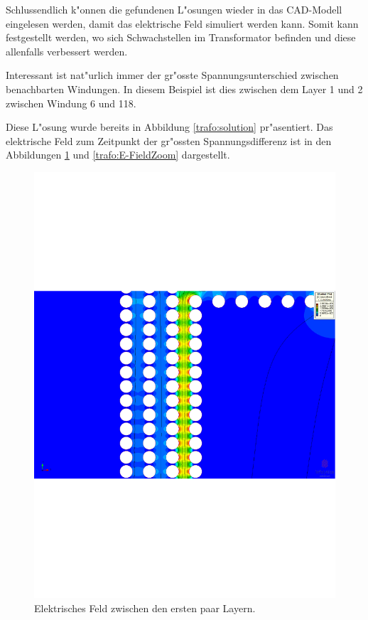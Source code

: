 \begin{refsection}
Schlussendlich k"onnen die gefundenen L"osungen wieder in das CAD-Modell eingelesen werden, damit das elektrische Feld simuliert werden kann. Somit kann festgestellt werden, wo sich Schwachstellen im Transformator befinden und diese allenfalls verbessert werden.

Interessant ist nat"urlich immer der gr"osste Spannungsunterschied zwischen benachbarten Windungen. In diesem Beispiel ist dies zwischen dem Layer 1 und 2 zwischen Windung 6 und 118.

Diese L"osung wurde bereits in Abbildung \ref{trafo:solution} pr"asentiert. Das elektrische Feld zum Zeitpunkt der gr"ossten Spannungsdifferenz ist in den Abbildungen \ref{trafo:E-Field} und \ref{trafo:E-FieldZoom} dargestellt. 

\begin{figure}
	\centering
	\includegraphics[width=\textwidth]{./trafo/images/BIL_VoltageTrans.pdf}
	\caption{Elektrisches Feld zwischen den ersten paar Layern.}
	\label{trafo:E-Field}
\end{figure}


\end{refsection}

